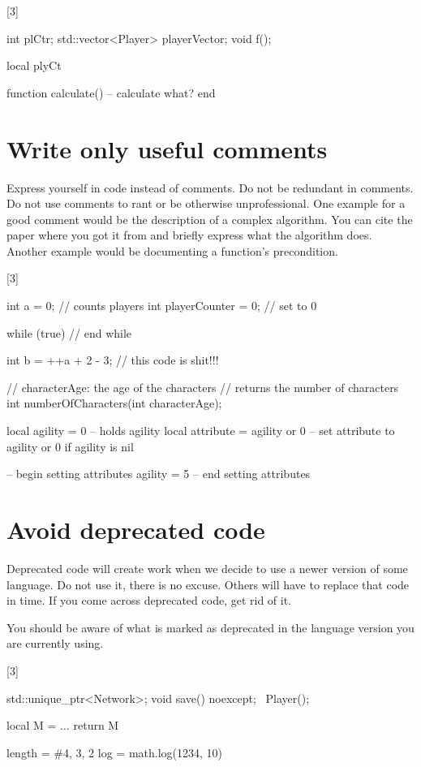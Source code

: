 \documentclass[a4paper,11pt]{scrreprt}
\newcommand{\marginMarker}[1]{%
\marginnote{%
    \hfill%
		\Huge{#1}%
}[3\baselineskip]%
}
\newcommand{\conforming}{%
\marginMarker{\textcolor{green}{\ding{51}}}%
}
\newcommand{\nonconforming}{%
\marginMarker{\textcolor{red}{\ding{55}}}%
}
\begin{document}
\nonconforming{}
\begin{cppBox}
int plCtr;
std::vector<Player> playerVector;
void f();
\end{cppBox}
\begin{luaBox}
local plyCt

function calculate() -- calculate what?
end
\end{luaBox}

\section{Write only useful comments}
Express yourself in code instead of comments. Do not be redundant in comments. Do not use comments to rant or be otherwise unprofessional. One example for a good comment would be the description of a complex algorithm. You can cite the paper where you got it from and briefly express what the algorithm does. Another example would be documenting a function's precondition.

\nonconforming{}
\begin{cppBox}
int a = 0; // counts players
int playerCounter = 0; // set to 0

while (true) {
} // end while

int b = ++a + 2 - 3; // this code is shit!!!

// characterAge: the age of the characters
// returns the number of characters
int numberOfCharacters(int characterAge);
\end{cppBox}
\begin{luaBox}
local agility = 0 -- holds agility
local attribute = agility or 0 -- set attribute to agility or 0 if agility is nil

-- begin setting attributes
agility = 5
-- end setting attributes
\end{luaBox}

\section{Avoid deprecated code}
Deprecated code will create work when we decide to use a newer version of some language. Do not use it, there is no excuse. Others will have to replace that code in time. If you come across deprecated code, get rid of it.

You should be aware of what is marked as deprecated in the language version you are currently using.

\conforming{}
\begin{cppBox}
std::unique_ptr<Network>;
void save() noexcept;
~Player();
\end{cppBox}
\begin{luaBox}[mathescape]
local M = {}
$\dots$
return M

length = #{4, 3, 2}
log = math.log(1234, 10)
\end{luaBox}
\end{document}

